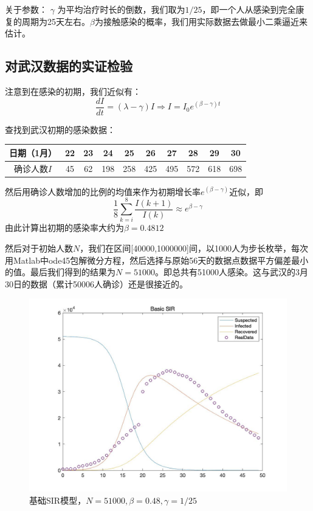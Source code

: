 \documentclass[UTF8]{ctexart}
\begin{document}
			关于参数： $\gamma$ 为平均治疗时长的倒数，我们取为$1/25$，即一个人从感染到完全康复的周期为25天左右。$\beta$为接触感染的概率，我们用实际数据去做最小二乘逼近来估计。
			
		\subsection{对武汉数据的实证检验}
			
			注意到在感染的初期，我们近似有：\[\frac{dI}{dt}=(\lambda-\gamma)I \Longrightarrow I =I_0 e^{ (\beta -  \gamma)t}  \]
			
			查找到武汉初期的感染数据：
			\begin{table}[H]
				\begin{center}
					\begin{tabular}{*{9}{c|}c}
						日期（1月）&22&23&24&25&26&27&28&29&30\\ \hline
						确诊人数$I$ & 45&62&198&258&425&495&572&618&698
					\end{tabular}
				\end{center}
			\end{table}
			
			然后用确诊人数增加的比例的均值来作为初期增长率$e^{(\beta-\gamma)}$近似，即\[\frac18 \sum_{k=i}^8\frac{I(k+1)}{I(k)} \approx e^{\beta-\gamma}\]
			由此计算出初期的感染率大约为$\beta=0.4812$
			
			然后对于初始人数$N$，我们在区间[40000,1000000]间，以1000人为步长枚举，每次用Matlab中ode45包解微分方程，然后选择与原始56天的数据点数据平方偏差最小的值。最后我们得到的结果为$N=51000$。即总共有51000人感染。这与武汉的3月30日的数据（累计50006人确诊）还是很接近的。
			\begin{figure}[H]
				\begin{center}
					\includegraphics[scale=0.3]{Basic_SIR}
					\caption{基础SIR模型，$N=51000,\beta=0.48,\gamma=1/25$}
				\end{center}
			\end{figure}
		
\end{document}
